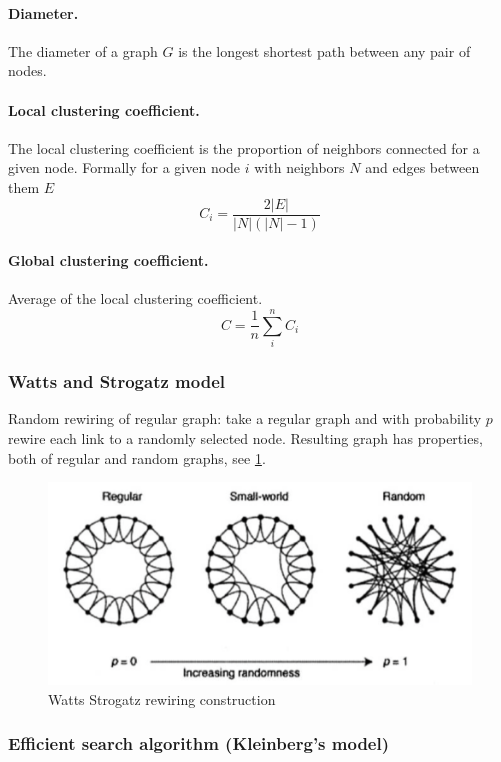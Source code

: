 \paragraph{Diameter.}
  The diameter of a graph $G$ is the longest shortest path between any pair of nodes.

\paragraph{Local clustering coefficient.}
  The local clustering coefficient is the proportion of neighbors connected for a given node. Formally for a given node $i$ with neighbors $N$ and edges between them $E$
  \[
    C_i = \frac { 2|E|}{|N|(|N|-1)}
  \]

\paragraph{Global clustering coefficient.}
  Average of the local clustering coefficient.
  \[
    C = \frac 1 n \sum_i^n C_i
  \]

\subsubsection{Watts and Strogatz model}

Random rewiring of regular graph: take a regular graph and with probability $p$ rewire each link to a randomly selected node. Resulting graph has properties, both of regular and random graphs, see \cref{fig:watts_strogatz}.

\begin{figure}
  \centering
  \includegraphics[width=1\linewidth]{figures/watts_strogatz_graph.png}
  \caption{Watts Strogatz rewiring construction}
  \label{fig:watts_strogatz}
\end{figure}

\subsubsection{Efficient search algorithm (Kleinberg’s model)}

